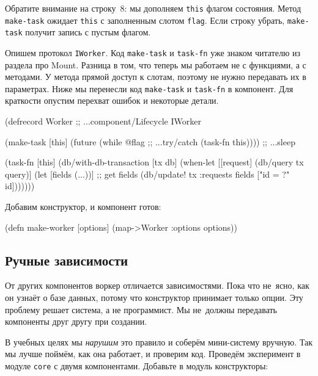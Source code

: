 Обратите внимание на строку~8: мы дополняем \verb|this| флагом
состояния. Метод \verb|make-task| ожидает \verb|this| с заполненным слотом
\verb|flag|. Если строку убрать, \verb|make-task| получит запись с пустым
флагом.


Опишем протокол \verb|IWorker|. Код \verb|make-task| и \verb|task-fn| уже
знаком читателю из раздела про Mount. Разница в том, что теперь мы работаем не с
функциями, а с методами. У метода прямой доступ к слотам, поэтому не нужно
передавать их в параметрах. Ниже мы перенесли код \verb|make-task| и
\verb|task-fn| в компонент. Для краткости опустим перехват ошибок и некоторые
детали.

\begin{english}
  \begin{clojure}
(defrecord Worker
  ;; ...component/Lifecycle
  IWorker

  (make-task [this]
    (future
      (while @flag        ;; ...try/catch
        (task-fn this)))) ;; ...sleep

  (task-fn [this]
    (db/with-db-transaction [tx db]
      (when-let [[request] (db/query tx query)]
        (let [fields (...))] ;; get fields
          (db/update! tx :requests
                      fields ["id = ?" id]))))))
  \end{clojure}
\end{english}

\noindent
Добавим конструктор, и компонент готов:


\begin{english}
  \begin{clojure}
(defn make-worker
  [options]
  (map->Worker {:options options}))
  \end{clojure}
\end{english}

\subsection{Ручные зависимости}


От других компонентов воркер отличается зависимостями. Пока что не~ясно, как
он узнаёт о базе данных, потому что конструктор принимает только опции. Эту
проблему решает система, а не программист. Мы не~должны передавать компоненты
друг другу при создании.

В учебных целях мы \emph{нарушим} это правило и соберём мини-систему
вручную. Так мы лучше поймём, как она работает, и проверим код. Проведём
эксперимент в модуле \verb|core| с двумя компонентами. Добавьте в модуль
конструкторы:

